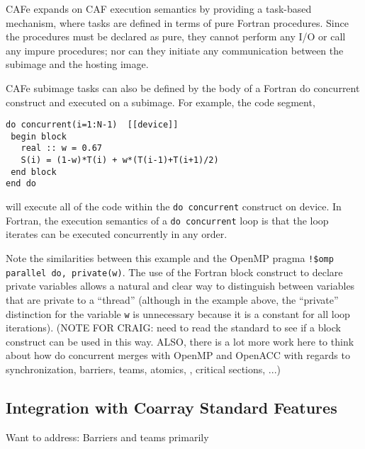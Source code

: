 CAFe expands on CAF execution semantics by providing a task-based mechanism, where tasks
are defined in terms of pure Fortran procedures.  Since the procedures must be declared
as pure, they cannot perform any I/O or call any impure procedures; nor can they initiate
any communication between the subimage and the hosting image.

CAFe subimage tasks can also be defined by the body of a Fortran do concurrent construct
and executed on a subimage.  For example, the code segment,
\begin{verbatim}
do concurrent(i=1:N-1)  [[device]]
 begin block
   real :: w = 0.67
   S(i) = (1-w)*T(i) + w*(T(i-1)+T(i+1)/2)
 end block
end do
\end{verbatim}
will execute all of the code within the \texttt{do concurrent} construct on device.  In
Fortran, the execution semantics of a \texttt{do concurrent} loop is that the loop
iterates can be executed concurrently in any order.

Note the similarities between this example and the OpenMP pragma \texttt{!\$omp parallel do,
private(w)}.  The use of the Fortran block construct to declare private
variables allows a natural and clear way to distinguish between variables that are private
to a ``thread'' (although in the example above, the ``private'' distinction for the
variable \texttt{w} is unnecessary because it is a constant for all loop iterations).
(NOTE FOR CRAIG: need to read the standard to see if a block construct can be used in this
way. ALSO, there is a lot more work here to think about how do concurrent merges with
OpenMP and OpenACC with regards to synchronization, barriers, teams, atomics,
, critical sections, ...)


\subsection{Integration with Coarray Standard Features}

Want to address: Barriers and teams primarily



%







